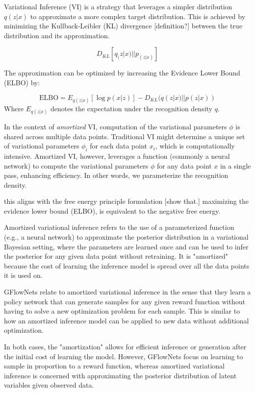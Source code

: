 Variational Inference (VI) is a strategy that leverages a simpler distribution \( q(z | x) \)  to approximate a more complex target distribution. This is achieved by minimizing the Kullback-Leibler (KL) divergence [definition?] between the true distribution and its approximation.

\[
    D_{KL}[q_(z|x) || p_(z|x)]
\]

The approximation can be optimized by increasing the Evidence Lower Bound (ELBO) by:

\begin{equation}
\text{ELBO} = E_{q(z|x)}[\log p(x|z)] - D_{KL}(q(z|x) || p(z|x))
\end{equation}
Where \( E_{q(z|x)} \) denotes the expectation under the recognition density \( q \).

In the context of \emph{amortized} VI, computation of the variational parameters \( \phi \) is shared across multiple data points. Traditional VI might determine a unique set of variational parameters \( \phi_i \) for each data point \( x_i \), which is computationally intensive. Amortized VI, however, leverages a function (commonly a neural network) to compute the variational parameters \( \phi \) for any data point \( x \) in a single pass, enhancing efficiency. In other words, we parameterize the recognition density. 

this aligns with the free energy principle formulation [show that.]
maximizing the evidence lower bound (ELBO), is equivalent to the negative free energy. 


Amortized variational inference refers to the use of a parameterized function (e.g., a neural network) to approximate the posterior distribution in a variational Bayesian setting, where the parameters are learned once and can be used to infer the posterior for any given data point without retraining. It is "amortized" because the cost of learning the inference model is spread over all the data points it is used on.

GFlowNets relate to amortized variational inference in the sense that they learn a policy network that can generate samples for any given reward function without having to solve a new optimization problem for each sample. This is similar to how an amortized inference model can be applied to new data without additional optimization.

In both cases, the "amortization" allows for efficient inference or generation after the initial cost of learning the model. However, GFlowNets focus on learning to sample in proportion to a reward function, whereas amortized variational inference is concerned with approximating the posterior distribution of latent variables given observed data.





